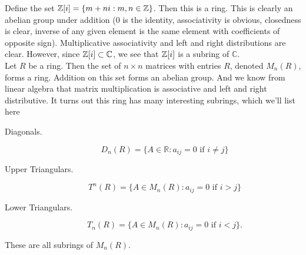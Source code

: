     \textcolor{Blue!80!White}{Define the set $\mathbb{Z}[i] = \{m + ni: m, n \in \mathbb{Z}\}$. 
    Then this is a ring.} This is
    clearly an abelian group under addition (0 is the identity, associativity is
    obvious, closedness is clear, inverse of any given element is
    the same element with coefficients of opposite sign).
    Multiplicative associativity and left and right distributions
    are clear. However, since $\mathbb{Z}[i] \subset \mathbb{C}$, we see
    that $\mathbb{Z}[i]$ is a subring of $\mathbb{C}$.
    \\

    \textcolor{Green!80!White}{Let $R$ be a ring. Then the set of $n \times n$ matrices with
    entries $R$, denoted $M_{n}(R)$, forms a ring.} Addition on
    this set forms an abelian group. And we know from linear
    algebra that matrix multiplication is associative and left and
    right distributive.
    It turns out this ring has many interesting subrings, which
    we'll list here 
    \begin{description}
        \item[Diagonals.]
            \[
                D_n(R) = \{A \in \mathbb{R}: a_{ij} = 0 \text{ if } i \ne j\}
            \]
        \item[Upper Triangulars.]
            \[
                T^n(R) = \{A \in M_n(R): a_{ij} = 0 \text{ if } i > j\}
            \] 
        \item[Lower Triangulars.]  
        \[
            T_n(R) = \{A \in M_n(R): a_{ij} = 0 \text{ if } i < j\}.
        \]  
    \end{description}
    These are all subrings of $M_n(R)$.
    \\
    
